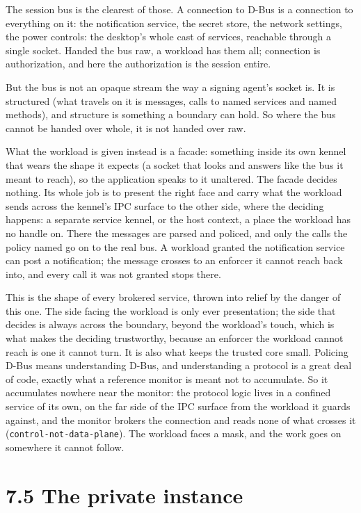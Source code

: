 The session bus is the clearest of those. A connection to D-Bus is a
connection to everything on it: the notification service, the secret
store, the network settings, the power controls: the desktop's whole
cast of services, reachable through a single socket. Handed the bus raw,
a workload has them all; connection is authorization, and here the
authorization is the session entire.

But the bus is not an opaque stream the way a signing agent's socket is.
It is structured (what travels on it is messages, calls to named
services and named methods), and structure is something a boundary can
hold. So where the bus cannot be handed over whole, it is not handed
over raw.

What the workload is given instead is a facade: something inside its own
kennel that wears the shape it expects (a socket that looks and answers
like the bus it meant to reach), so the application speaks to it
unaltered. The facade decides nothing. Its whole job is to present the
right face and carry what the workload sends across the kennel's IPC
surface to the other side, where the deciding happens: a separate
service kennel, or the host context, a place the workload has no handle
on. There the messages are parsed and policed, and only the calls the
policy named go on to the real bus. A workload granted the notification
service can post a notification; the message crosses to an enforcer it
cannot reach back into, and every call it was not granted stops there.

This is the shape of every brokered service, thrown into relief by the
danger of this one. The side facing the workload is only ever
presentation; the side that decides is always across the boundary,
beyond the workload's touch, which is what makes the deciding
trustworthy, because an enforcer the workload cannot reach is one it
cannot turn. It is also what keeps the trusted core small. Policing
D-Bus means understanding D-Bus, and understanding a protocol is a great
deal of code, exactly what a reference monitor is meant not to
accumulate. So it accumulates nowhere near the monitor: the protocol
logic lives in a confined service of its own, on the far side of the IPC
surface from the workload it guards against, and the monitor brokers the
connection and reads none of what crosses it
(\texttt{control-not-data-plane}). The workload faces a mask, and the
work goes on somewhere it cannot follow.

\hypertarget{the-private-instance}{%
\section{7.5 The private instance}\label{the-private-instance}}

